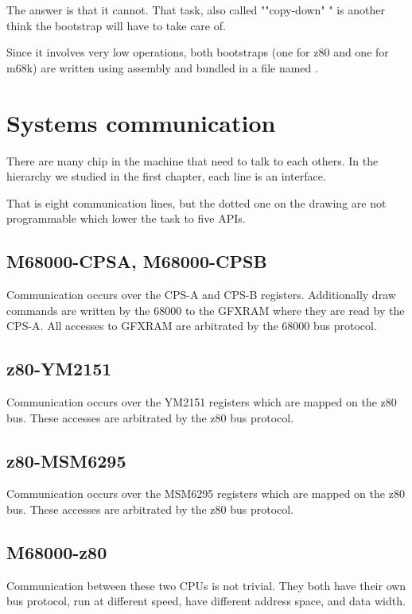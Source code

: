 The answer is that it cannot. That  task, also called ""copy-down" " is another think the bootstrap will have to take care of.

Since it involves very low operations, both bootstraps (one for z80 and one for m68k) are written using assembly and bundled in a file named .





\section{Systems communication}

There are many chip in the machine that need to talk to each others. In the hierarchy we studied in the first chapter, each line is an interface. 


That is eight communication lines, but the dotted one on the drawing are not programmable which lower the task to five APIs.

\subsection{M68000-CPSA, M68000-CPSB} Communication occurs over the CPS-A and CPS-B registers. Additionally draw commands are written by the 68000 to the GFXRAM where they are read by the CPS-A. All accesses to GFXRAM are arbitrated by the 68000 bus protocol.

\subsection{z80-YM2151} Communication occurs over the YM2151 registers which are mapped on the z80 bus. These accesses are arbitrated by the z80 bus protocol.

\subsection{z80-MSM6295} Communication  occurs over the MSM6295 registers which are mapped on the z80 bus. These accesses are arbitrated by the z80 bus protocol. 

\subsection{M68000-z80} Communication between these two CPUs is not trivial. They both have their own bus protocol, run at different speed, have different address space, and data width.

